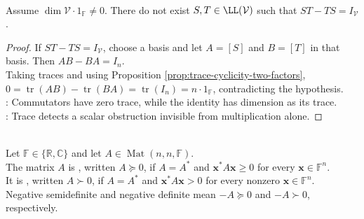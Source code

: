 \begin{corollary} \label{cor:identity-is-not-operator-commutator} \\
Assume $\dim\mathcal{V}\cdot1_{\mathbb{F}}\neq0$. There do not exist $S,T\in\LL(\mathcal{V})$ such that $ST-TS=I_{\mathcal{V}}$.
\begin{proof}
If $ST-TS=I_{\mathcal{V}}$, choose a basis and let $A=[S]$ and $B=[T]$ in that basis. Then $AB-BA=I_n$.\\
Taking traces and using Proposition \ref{prop:trace-cyclicity-two-factors}, $0=\operatorname{tr}(AB)-\operatorname{tr}(BA)=\operatorname{tr}(I_n)=n\cdot1_{\mathbb{F}}$, contradicting the hypothesis.\\
: Commutators have zero trace, while the identity has dimension as its trace.\\
: Trace detects a scalar obstruction invisible from multiplication alone.
\end{proof}
\end{corollary}

\begin{definition} \label{def:positive-semidefinite-matrix} \\
Let $\mathbb{F}\in\{\mathbb{R},\mathbb{C}\}$ and let $A\in\operatorname{Mat}(n,n,\mathbb{F})$.\\
The matrix $A$ is , written $A\succeq0$, if $A=A^*$ and $\mathbf{x}^*A\mathbf{x}\geq0$ for every $\mathbf{x}\in\mathbb{F}^n$.\\
It is , written $A\succ0$, if $A=A^*$ and $\mathbf{x}^*A\mathbf{x}>0$ for every nonzero $\mathbf{x}\in\mathbb{F}^n$.\\
Negative semidefinite and negative definite mean $-A\succeq0$ and $-A\succ0$, respectively.
\end{definition}

